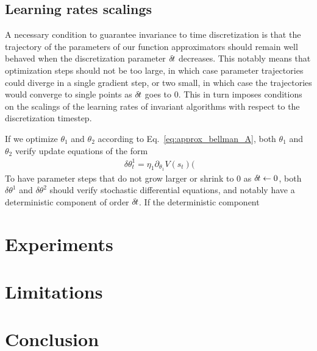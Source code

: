 \documentclass{article}
\begin{document}
\subsection{Learning rates scalings}
\label{subsec:lr}
A necessary condition to guarantee invariance to time discretization is that
the trajectory of the parameters of our function approximators should remain
well behaved when the discretization parameter $\delta\hspace{-.1em}t$ decreases. This notably
means that optimization steps should not be too large, in which case parameter
trajectories could diverge in a single gradient step, or two small, in which case
the trajectories would converge to single points as $\delta\hspace{-.1em}t$ goes to $0$.
This in turn imposes conditions on the scalings of the learning rates of invariant
algorithms with respect to the discretization timestep.

If we optimize $\theta_1$ and $\theta_2$ according to Eq.~\eqref{eq:approx_bellman_A},
both $\theta_1$ and $\theta_2$ verify update equations of the form
\begin{align}
	\
	\delta \theta^1_t = \eta_1 \partial_{\theta_1} V(s_t) (
\end{align}
To have parameter steps that do not grow larger or shrink to $0$ as $\delta\hspace{-.1em}t
\leftarrow 0$, both $\delta \theta^1$ and $\delta \theta^2$ should verify
stochastic differential equations, and notably have a deterministic component
of order $\delta\hspace{-.1em}t$. If the deterministic component 
\section{Experiments}
\label{sec:exp}

\section{Limitations}
\label{sec:limitations}
\section{Conclusion}
\label{sec:concl}



\end{document}
